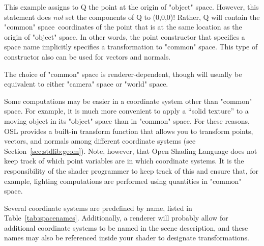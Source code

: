 \documentclass[11pt,letterpaper]{book}
\def\langname{Open Shading Language\xspace}
\def\commonspace{{\cf "common"} space\xspace}
\def\worldspace{{\cf "world"} space\xspace}
\def\cameraspace{{\cf "camera"} space\xspace}
\def\objectspace{{\cf "object"} space\xspace}
\begin{document}
This example assigns to {\cf Q} the point at the origin of
\objectspace.  However, this statement does \emph{not} set the
components of {\cf Q} to (0,0,0)!  Rather, {\cf Q} will contain the
\commonspace\ coordinates of the point that is at the same location as
the origin of \objectspace.  In other words, the point constructor that
specifies a space name implicitly specifies a transformation
to \commonspace.  This type of constructor also can be used for vectors
and normals.

The choice of \commonspace is renderer-dependent, though will usually
be equivalent to either \cameraspace or \worldspace.

Some computations may be easier in a coordinate system other than
\commonspace.  For example, it is much more convenient to apply a
``solid texture'' to a moving object in its \objectspace than in
\commonspace.  For these reasons, OSL provides a built-in
{\cf transform} function that
allows you to transform points, vectors, and normals 
among different coordinate systems (see Section~\ref{sec:stdlib:geom}).  Note,
however, that \langname does not keep track of which point variables are
in which coordinate systems.  It is the responsibility of the shader
programmer to keep track of this and ensure that, for example, lighting
computations are performed using quantities in \commonspace.

Several coordinate systems are predefined by name, listed in
Table~\ref{tab:spacenames}.  Additionally, a renderer will probably
allow for additional coordinate systems to be named in the scene
description, and these names may also be referenced inside your shader
to designate transformations.
\end{document}
